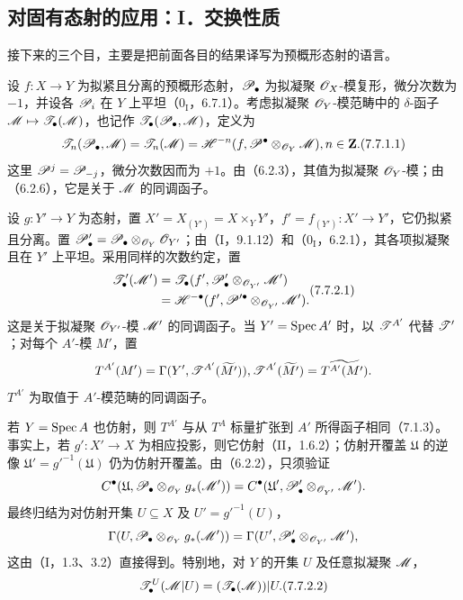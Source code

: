 \subsection{对固有态射的应用：I．交换性质}
接下来的三个目，主要是把前面各目的结果译写为预概形态射的语言。

设 $f:X\to Y$ 为拟紧且分离的预概形态射，$\mathscr P_\bullet$ 为拟凝聚 $\mathscr O_X$-模复形，微分次数为 $-1$，并设各 $\mathscr P_i$ 在 $Y$ 上平坦（$0_{\mathrm I}$，6.7.1）。考虑拟凝聚 $\mathscr O_Y$-模范畴中的 $\delta$-函子 $\mathscr M\mapsto\mathscr T_\bullet(\mathscr M)$，也记作 $\mathscr T_\bullet(\mathscr P_\bullet,\mathscr M)$，定义为
\begin{equation}
 \TT_n(\PP_\bullet,\M)=\TT_n(\M)
 =\cH^{-n}(f,\PP^\bullet\otimes_{\OO_Y}\M),\qquad n\in\mathbf Z.
 \tag{7.7.1.1}
\end{equation}
这里 $\mathscr P^j=\mathscr P_{-j}$，微分次数因而为 $+1$。由（6.2.3），其值为拟凝聚 $\mathscr O_Y$-模；由（6.2.6），它是关于 $\mathscr M$ 的同调函子。

设 $g:Y'\to Y$ 为态射，置 $X'=X_{(Y')}=X\times_Y Y'$，$f'=f_{(Y')}:X'\to Y'$，它仍拟紧且分离。置 $\mathscr P'_\bullet=\mathscr P_\bullet\otimes_{\mathscr O_Y}\mathscr O_{Y'}$；由（I，9.1.12）和（$0_{\mathrm I}$，6.2.1），其各项拟凝聚且在 $Y'$ 上平坦。采用同样的次数约定，置
\begin{equation}
 \begin{aligned}
 \TT'_\bullet(\M')
 &=\TT_\bullet(f',\PP'_\bullet\otimes_{\OO_{Y'}}\M')\\
 &=\cH^{-\bullet}(f',\PP'^\bullet\otimes_{\OO_{Y'}}\M').
 \end{aligned}\tag{7.7.2.1}
\end{equation}
这是关于拟凝聚 $\mathscr O_{Y'}$-模 $\mathscr M'$ 的同调函子。当 $Y'=\operatorname{Spec} A'$ 时，以 $\mathscr T^{A'}$ 代替 $\mathscr T'$；对每个 $A'$-模 $M'$，置
\[
 T^{A'}(M')=\Gamma(Y',\mathscr T^{A'}(\widetilde{M'})),
 \mathscr T^{A'}(\widetilde{M'})=\widetilde{T^{A'}(M')}.
\]
$T^{A'}$ 为取值于 $A'$-模范畴的同调函子。

若 $Y=\operatorname{Spec} A$ 也仿射，则 $T^{A'}$ 与从 $T^A$ 标量扩张到 $A'$ 所得函子相同（7.1.3）。事实上，若 $g':X'\to X$ 为相应投影，则它仿射（II，1.6.2）；仿射开覆盖 $\mathfrak U$ 的逆像 $\mathfrak U'=g'^{-1}(\mathfrak U)$ 仍为仿射开覆盖。由（6.2.2），只须验证
\[
 C^\bullet(\mathfrak U,\mathscr P_\bullet\otimes_{\mathscr O_Y}g_*(\mathscr M'))
 =C^\bullet(\mathfrak U',\mathscr P'_\bullet\otimes_{\mathscr O_{Y'}}\mathscr M').
\]
最终归结为对仿射开集 $U\subseteq X$ 及 $U'=g'^{-1}(U)$，
\[
 \Gamma(U,\mathscr P_\bullet\otimes_{\mathscr O_Y}g_*(\mathscr M'))
 =\Gamma(U',\mathscr P'_\bullet\otimes_{\mathscr O_{Y'}}\mathscr M'),
\]
这由（I，1.3、3.2）直接得到。特别地，对 $Y$ 的开集 $U$ 及任意拟凝聚 $\mathscr M$，
\begin{equation}
 \TT^U_\bullet(\M|U)=(\TT_\bullet(\M))|U.\tag{7.7.2.2}
\end{equation}

